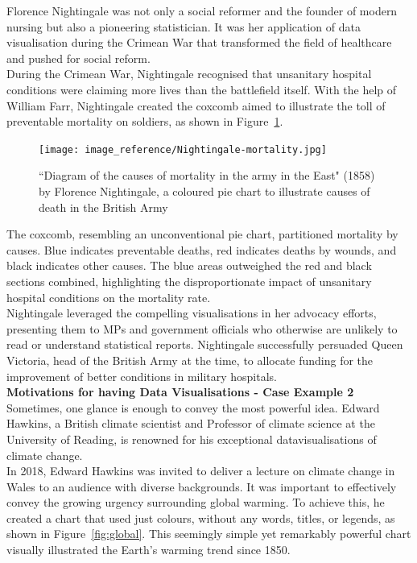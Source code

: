 \documentclass{article}\usepackage[]{graphicx}\usepackage[]{xcolor}
\begin{document}
\noindent
Florence Nightingale was not only a social reformer and the founder of modern nursing but also a pioneering statistician. It was her application of data visualisation during the Crimean War that transformed the field of healthcare and pushed for social reform.\\  

\noindent
During the Crimean War, Nightingale recognised that unsanitary hospital conditions were claiming more lives than the battlefield itself. With the help of William Farr, Nightingale created the coxcomb aimed to illustrate the toll of preventable mortality on soldiers, as shown in Figure~\ref{fig:coxcomb}.

\begin{figure}[H]
    \centering
    \texttt{[image: image\_reference/Nightingale-mortality.jpg]}
    \caption{``Diagram of the causes of mortality in the army in the East" (1858) by Florence Nightingale, a coloured pie chart to illustrate causes of death in the British Army \cite{graphFN}}
    \label{fig:coxcomb}
\end{figure}

\noindent 
The coxcomb, resembling an unconventional pie chart, partitioned mortality by causes. Blue indicates preventable deaths, red indicates deaths by wounds, and black indicates other causes. The blue areas outweighed the red and black sections combined, highlighting the disproportionate impact of unsanitary hospital conditions on the mortality rate.\\

\noindent
Nightingale leveraged the compelling visualisations in her advocacy efforts, presenting them to MPs and government officials who otherwise are unlikely to read or understand statistical reports. Nightingale successfully persuaded Queen Victoria, head of the British Army at the time, to allocate funding for the improvement of better conditions in military hospitals.\\

\noindent
\textbf{Motivations for having Data Visualisations - Case Example 2}\\

\noindent
Sometimes, one glance is enough to convey the most powerful idea. Edward Hawkins, a British climate scientist and Professor of climate science at the University of Reading, is renowned for his exceptional datavisualisations of climate change.\\

\noindent
In 2018, Edward Hawkins was invited to deliver a lecture on climate change in Wales to an audience with diverse backgrounds. It was important to effectively convey the growing urgency surrounding global warming. To achieve this, he created a chart that used just colours, without any words, titles, or legends, as shown in Figure~\ref{fig:global}. This seemingly simple yet remarkably powerful chart visually illustrated the Earth's warming trend since 1850.
\end{document}
